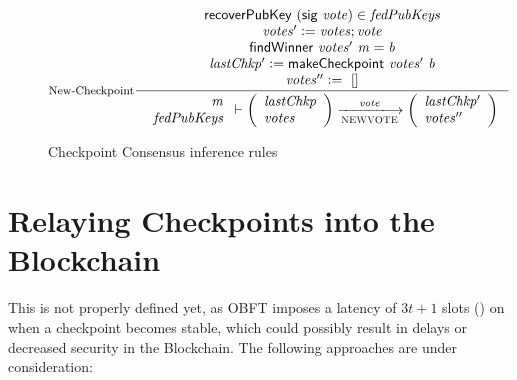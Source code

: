 \begin{figure}[tbh]
  \begin{equation}\label{eq:new-checkpoint}
    \inference[New-Checkpoint]
    {
      \fun{recoverPubKey}~(\fun{sig}~\var{vote}) \in \var{fedPubKeys} \\
      \var{votes'}\leteq\var{votes};\var{vote} \\
      \fun{findWinner}~\var{votes'}~\var{m} = \var{b} \\
      \var{lastChkp'}\leteq\fun{makeCheckpoint}~\var{votes'}~\var{b} \\
      \var{votes''}\leteq~[]
    }
    {
      \begin{array}{r}
        \var{m}\\
        \var{fedPubKeys}
      \end{array}
      \vdash
      \left(
      \begin{array}{l}
        \var{lastChkp}\\
        \var{votes}\\
      \end{array}
      \right)
      \trans{NEWVOTE}{\var{vote}}
      \left(
      \begin{array}{l}
        \var{lastChkp'}\\
        \var{votes''}\\
      \end{array}
      \right)
    }
  \end{equation}
  \caption{Checkpoint Consensus inference rules}
  \label{fig:checkpoint-consensus-rules}
\end{figure}

\clearpage
\section{Relaying Checkpoints into the Blockchain}

This is not properly defined yet, as OBFT imposes a latency of $3t + 1$ slots (\cite{obft-paper}) on when a checkpoint becomes stable, which could possibly result in delays or decreased security in the Blockchain. The following approaches are under consideration:

